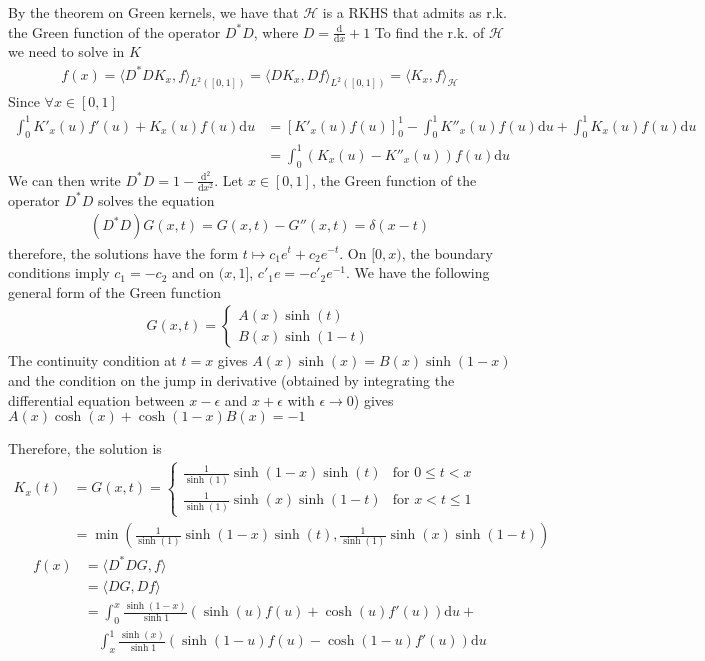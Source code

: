 \documentclass[10pt]{article}
\begin{document}
    By the theorem on Green kernels, we have that $\mathcal{H}$
    is a RKHS that admits as r.k. the Green function of the operator $D^*D$, 
    where $D = \frac{\text{d}}{\text{d}x} + 1$
    To find the r.k. of $\mathcal{H}$ we need to solve in $K$
    \begin{align*}
        f(x) = \langle D^*DK_x, f\rangle_{L^2([0, 1])} = \langle DK_x, 
        Df\rangle_{L^2([0, 1])} = \langle K_x, f\rangle_{\mathcal{H}}
    \end{align*}
    Since $\forall x \in [0, 1]$
    \begin{align*}
        \int_0^1 K'_x(u)f'(u) + K_x(u)f(u)\text{d}u& = \left[K'_x(u)f(u)
        \right]^1_0 - \int_0^1K''_x(u)f(u)\text{d}u + 
        \int_0^1K_x(u)f(u)\text{d}u\\& = \int_0^1 (K_x(u) - K''_x(u))f(u)
        \text{d}u
    \end{align*}
    We can then write $D^*D = 1 - \frac{\text{d}^2}{\text{d}x^2}$. Let $x
    \in[0, 1]$, the Green function of the operator $D^*D$ solves the equation 
    \begin{align*}
        (D^*D) G(x, t) = G(x, t) - G''(x, t)  = \delta(x-t)
    \end{align*} therefore, the solutions have the form $t\mapsto 
    c_1 e^t + c_2 e^{-t}$. On $[0, x)$, the boundary conditions imply $c_1 = 
    -c_2$ and on $(x, 1]$, $c'_1e = -c'_2e^{-1}$. We have the following general 
    form of the Green function
    \begin{align*}
        G(x, t) = \begin{cases}
            A(x)\sinh(t)\\
            B(x)\sinh(1 - t)
        \end{cases}
    \end{align*}
    The continuity condition at $t=x$ gives $A(x)\sinh(x) = B(x)\sinh(1-x)$ and 
    the condition on the jump in derivative (obtained by 
    integrating the differential equation between $x-\epsilon$ and
     $x+\epsilon$ with $\epsilon \rightarrow 0$) gives $  A(x) \cosh(x) + 
     \cosh(1-x)B(x) = -1$

    Therefore, the solution is 
    \begin{align*}
    K_x(t) &= G(x, t) = \begin{cases}
        \frac{1}{\sinh(1)}\sinh(1-x)\sinh(t)  & \text{for } 0\leq t < x\\
        \frac{1}{\sinh(1)}\sinh(x)\sinh(1 - t)& \text{for } x < t\leq 1
    \end{cases}\\
    & = \min\left(\frac{1}{\sinh(1)}\sinh(1-x)\sinh(t), 
    \frac{1}{\sinh(1)}\sinh(x)\sinh(1 - t)\right) 
    \end{align*}
    \begin{align*}
        f(x) &= \langle D^* D G, f \rangle\\
        & = \langle  D G, Df \rangle  \\
        &= \int_0^x \frac{\sinh(1-x)}{\sinh 1} 
        (\sinh(u)f(u) + \cosh(u)f'(u ) )\text{d}u + \\
        &\quad \int_x^1  \frac{\sinh(x)}{\sinh 1} 
        (\sinh(1-u)f(u) - \cosh(1- u)f'(u))\text{d}u
    \end{align*}
\end{document}
